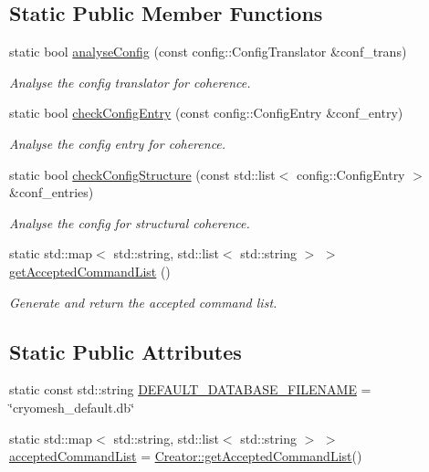 \subsection*{\-Static \-Public \-Member \-Functions}
\begin{DoxyCompactItemize}
\item 
static bool \hyperlink{classcryomesh_1_1manager_1_1Creator_a69a825d7856c367e400b2ff6e2cefe68}{analyse\-Config} (const config\-::\-Config\-Translator \&conf\-\_\-trans)
\begin{DoxyCompactList}\small\item\em \-Analyse the config translator for coherence. \end{DoxyCompactList}\item 
static bool \hyperlink{classcryomesh_1_1manager_1_1Creator_ae3d7dd77beadb0d05bbbe5f0c67e8292}{check\-Config\-Entry} (const config\-::\-Config\-Entry \&conf\-\_\-entry)
\begin{DoxyCompactList}\small\item\em \-Analyse the config entry for coherence. \end{DoxyCompactList}\item 
static bool \hyperlink{classcryomesh_1_1manager_1_1Creator_add4748985eb8bc35a442a9e4e4c2a087}{check\-Config\-Structure} (const std\-::list$<$ config\-::\-Config\-Entry $>$ \&conf\-\_\-entries)
\begin{DoxyCompactList}\small\item\em \-Analyse the config for structural coherence. \end{DoxyCompactList}\item 
static std\-::map$<$ std\-::string, \*
std\-::list$<$ std\-::string $>$ $>$ \hyperlink{classcryomesh_1_1manager_1_1Creator_aa6de6b79f746213f844b207518b1577a}{get\-Accepted\-Command\-List} ()
\begin{DoxyCompactList}\small\item\em \-Generate and return the accepted command list. \end{DoxyCompactList}\end{DoxyCompactItemize}
\subsection*{\-Static \-Public \-Attributes}
\begin{DoxyCompactItemize}
\item 
static const std\-::string \hyperlink{classcryomesh_1_1manager_1_1Creator_a36ec491bb68e6a595086c239af7bd989}{\-D\-E\-F\-A\-U\-L\-T\-\_\-\-D\-A\-T\-A\-B\-A\-S\-E\-\_\-\-F\-I\-L\-E\-N\-A\-M\-E} = \char`\"{}cryomesh\-\_\-default.\-db\char`\"{}
\item 
static std\-::map$<$ std\-::string, \*
std\-::list$<$ std\-::string $>$ $>$ \hyperlink{classcryomesh_1_1manager_1_1Creator_ad0ddc3782c7fe0415181156fdeb6306b}{accepted\-Command\-List} = \hyperlink{classcryomesh_1_1manager_1_1Creator_aa6de6b79f746213f844b207518b1577a}{\-Creator\-::get\-Accepted\-Command\-List}()
\end{DoxyCompactItemize}
